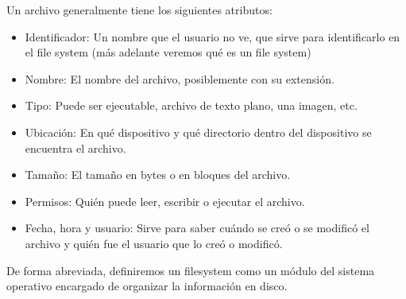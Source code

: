 \documentclass{article}
\begin{document}
Un archivo generalmente tiene los siguientes atributos:

\begin{itemize}
\item Identificador: Un nombre que el usuario no ve, que sirve para identificarlo en el file system (m\'as adelante veremos qu\'e es un file system)
\item Nombre: El nombre del archivo, posiblemente con su extensi\'on.
\item Tipo: Puede ser ejecutable, archivo de texto plano, una imagen, etc.
\item Ubicaci\'on: En qu\'e dispositivo y qu\'e directorio dentro del dispositivo se encuentra el archivo.
\item Tama\~no: El tama\~no en bytes o en bloques del archivo.
\item Permisos: Qui\'en puede leer, escribir o ejecutar el archivo.
\item Fecha, hora y usuario: Sirve para saber cu\'ando se cre\'o o se modific\'o el archivo y qui\'en fue el usuario que lo cre\'o o modific\'o.
\end{itemize}

De forma abreviada, definiremos un filesystem como un módulo del sistema operativo encargado de organizar la información en disco.

% 
\end{document}
